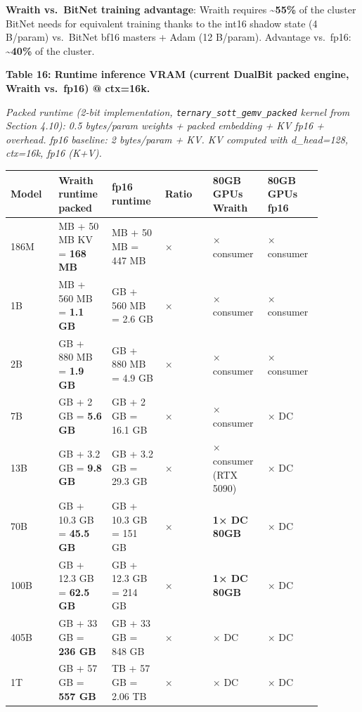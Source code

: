 \textbf{Wraith vs.~BitNet training advantage}: Wraith requires
\textbf{\textasciitilde55\%} of the cluster BitNet needs for equivalent
training thanks to the int16 shadow state (4 B/param) vs.~BitNet bf16
masters + Adam (12 B/param). Advantage vs.~fp16:
\textbf{\textasciitilde40\%} of the cluster.

\textbf{Table 16: Runtime inference VRAM (current DualBit packed engine,
Wraith vs.~fp16) @ ctx=16k.}

\emph{Packed runtime (2-bit implementation,
\texttt{ternary\_sott\_gemv\_packed} kernel from Section 4.10): 0.5
bytes/param weights + packed embedding + KV fp16 + overhead. fp16
baseline: 2 bytes/param + KV. KV computed with d\_head=128, ctx=16k,
fp16 (K+V).}

{\def\LTcaptype{none} %
{\footnotesize\setlength{\tabcolsep}{3pt}
\begin{longtable}[]{@{}>{\raggedright\arraybackslash}p{0.147\linewidth}>{\raggedright\arraybackslash}p{0.147\linewidth}>{\raggedright\arraybackslash}p{0.147\linewidth}>{\raggedright\arraybackslash}p{0.147\linewidth}>{\raggedright\arraybackslash}p{0.147\linewidth}>{\raggedright\arraybackslash}p{0.147\linewidth}@{}}
\toprule\noalign{}
Model & Wraith runtime packed & fp16 runtime & Ratio & 80GB GPUs Wraith & 80GB GPUs fp16 \\
\midrule\noalign{}
\endhead
\bottomrule\noalign{}
\endlastfoot
186M & 118 MB + 50 MB KV = \textbf{168 MB} & 397 MB + 50 MB = 447 MB &
2.7× & 1× consumer & 1× consumer \\
1B & 550 MB + 560 MB = \textbf{1.1 GB} & 2.05 GB + 560 MB = 2.6 GB &
2.4× & 1× consumer & 1× consumer \\
2B & 1.05 GB + 880 MB = \textbf{1.9 GB} & 4.05 GB + 880 MB = 4.9 GB &
2.6× & 1× consumer & 1× consumer \\
7B & 3.6 GB + 2 GB = \textbf{5.6 GB} & 14.1 GB + 2 GB = 16.1 GB & 2.9× &
1× consumer & 1× DC \\
13B & 6.6 GB + 3.2 GB = \textbf{9.8 GB} & 26.1 GB + 3.2 GB = 29.3 GB &
3.0× & 1× consumer (RTX 5090) & 1× DC \\
70B & 35.2 GB + 10.3 GB = \textbf{45.5 GB} & 141 GB + 10.3 GB = 151 GB &
3.3× & \textbf{1× DC 80GB} & 2× DC \\
100B & 50.2 GB + 12.3 GB = \textbf{62.5 GB} & 202 GB + 12.3 GB = 214 GB
& 3.4× & \textbf{1× DC 80GB} & 3× DC \\
405B & 203 GB + 33 GB = \textbf{236 GB} & 815 GB + 33 GB = 848 GB & 3.6×
& 3× DC & 11× DC \\
1T & 500 GB + 57 GB = \textbf{557 GB} & 2 TB + 57 GB = 2.06 TB & 3.7× &
7× DC & 26× DC \\
\end{longtable}
}
}

